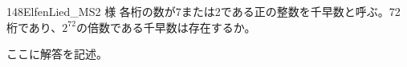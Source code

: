 \begin{prob}{148}{}{ElfenLied\_MS2 様}
 各桁の数が7または2である正の整数を千早数と呼ぶ。72桁であり、$2^{72}$の倍数である千早数は存在するか。
\end{prob}
ここに解答を記述。